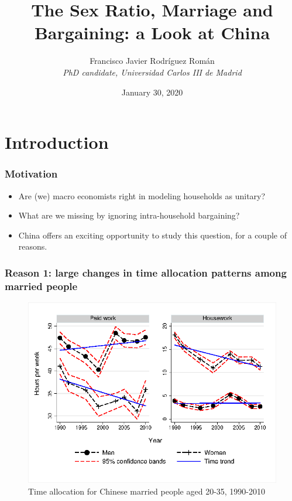 \documentclass{beamer}
\title[]{The Sex Ratio, Marriage and Bargaining: a Look at China}
\author[Francisco Javier Rodr\'iguez]{Francisco Javier Rodr\'iguez Rom\'an \\
\textit{PhD candidate, Universidad Carlos III de Madrid}}
\institute[UC3M]{
\textit{Job Market Seminar, Department of Economics, Pontificia Universidad Javeriana} 
}
\date{January 30, 2020}
\begin{document}
\begin{frame}
\titlepage
\end{frame}


\section{Introduction}

\begin{frame}
	\frametitle{Motivation}
	\begin{itemize}
		\item Are (we)  macro economists right in modeling households as unitary?
		\item What are we missing by ignoring intra-household bargaining?
		\item China offers an exciting opportunity to study this question, for a couple of reasons.
	\end{itemize}
\end{frame}

\begin{frame}
	\frametitle{Reason 1: large changes in time allocation patterns among married people}\label{frame:time_allocation}
	\begin{figure}
		\centering
		\caption{Time allocation for Chinese married people aged 20-35, 1990-2010}
		\includegraphics[width=.6\textwidth]{ta_married}
	\end{figure}
	\hyperlink{appendix:leisure_ratio}{}
\end{frame}
\end{document}
